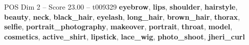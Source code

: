 \begin{textsample}{POS Dim 2 – Score 23.00 – t009329}  \label{ex:f2_pos_013}
\textbf{eyebrow}, \textbf{lips}, \textbf{shoulder}, \textbf{hairstyle}, \textbf{beauty}, \textbf{neck}, \textbf{black\_hair}, \textbf{eyelash}, \textbf{long\_hair}, \textbf{brown\_hair}, \textbf{thorax}, \textbf{selfie}, \textbf{portrait\_photography}, \textbf{makeover}, \textbf{portrait}, \textbf{throat}, \textbf{model}, \textbf{cosmetics}, \textbf{active\_shirt}, \textbf{lipstick}, \textbf{lace\_wig}, \textbf{photo\_shoot}, \textbf{jheri\_curl}

\end{textsample}
